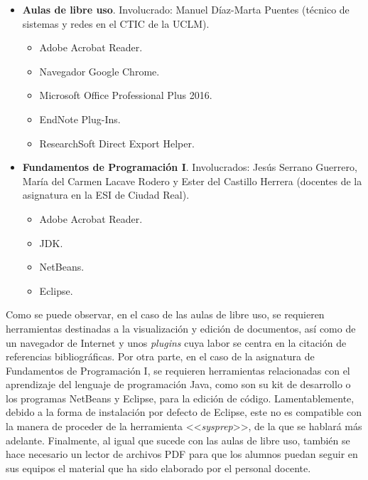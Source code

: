 \begin{itemize}
    \item \textbf{Aulas de libre uso}. Involucrado: Manuel Díaz-Marta Puentes (técnico de sistemas y redes en el \acs{CTIC} de la \acs{UCLM}).
    
        \begin{itemize}
            \item Adobe Acrobat Reader.
            \item Navegador Google Chrome.
            \item Microsoft Office Professional Plus 2016.
            \item EndNote Plug-Ins.
            \item ResearchSoft Direct Export Helper.
        \end{itemize}
        
    \item \textbf{Fundamentos de Programación I}. Involucrados: Jesús Serrano Guerrero, María del Carmen Lacave Rodero y Ester del Castillo Herrera (docentes de la asignatura en la \acs{ESI} de Ciudad Real).
    
        \begin{itemize}
            \item Adobe Acrobat Reader.
            \item \acf{JDK}.
            \item NetBeans.
            \item Eclipse.
        \end{itemize}
\end{itemize}

Como se puede observar, en el caso de las aulas de libre uso, se requieren herramientas destinadas a la visualización y edición de documentos, así como de un navegador de Internet y unos \textit{plugins} cuya labor se centra en la citación de referencias bibliográficas. Por otra parte, en el caso de la asignatura de Fundamentos de Programación I, se requieren herramientas relacionadas con el aprendizaje del lenguaje de programación Java, como son su kit de desarrollo o los programas NetBeans y Eclipse, para la edición de código. Lamentablemente, debido a la forma de instalación por defecto de Eclipse, este no es compatible con la manera de proceder de la herramienta <<\textit{sysprep}>>, de la que se hablará más adelante. Finalmente, al igual que sucede con las aulas de libre uso, también se hace necesario un lector de archivos \acs{PDF} para que los alumnos puedan seguir en sus equipos el material que ha sido elaborado por el personal docente.

